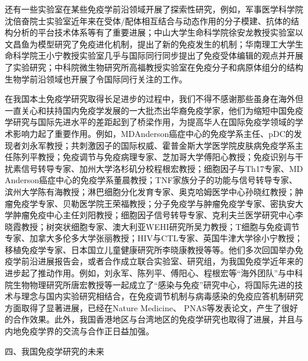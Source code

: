 还有一些实验室在某些免疫学前沿领域开展了探索性研究，例如，军事医学科学院沈倍奋院士实验室近年来在受体/配体相互结合与动态作用的分子模建、抗体的结构分析的平台技术体系等有了重要进展；中山大学生命科学院徐安龙教授实验室以文昌鱼为模型研究了免疫进化机制，提出了新的免疫发生的机制；华南理工大学生命科学院王小宁教授实验室几乎与国际同行同步提出了免疫受体编辑的观点并开展了实验研究；中科院微生物研究所高福教授实验室在免疫分子和病原体组分的结构生物学前沿领域也开展了令国际同行关注的工作。

在我国本土免疫学研究取得长足进步的过程中，我们不得不感谢那些虽身在海外但一直关心和扶持国内免疫学发展的一大批杰出华裔免疫学家，他们为缩短中国免疫学研究与国际先进水平的差距起到了桥梁作用，为提高华人在国际免疫学领域的学术影响力起了重要作用。例如，MDAnderson癌症中心的免疫学系主任、pDC的发现者刘永军教授；共刺激因子的国际权威、霍普金斯大学医学院皮肤病免疫学系主任陈列平教授；免疫调节与免疫病理专家、芝加哥大学傅阳心教授；免疫识别与干扰素信号转导专家、加州大学洛杉矶分校程根宏教授；细胞因子与Th17专家、MD
Anderson癌症中心的免疫学系董晨教授；TNF家族分子的功能与信号转导专家、滨州大学陈有海教授；淋巴细胞分化发育专家、奥克哈姆医学中心孙晓红教授；肿瘤免疫学专家、贝勒医学院王荣福教授；分子免疫学与肿瘤免疫学专家、密执安大学肿瘤免疫中心主任刘阳教授；细胞因子信号转导专家、克利夫兰医学研究中心李晓霞教授；树突状细胞专家、澳大利亚WEHI研究所吴力教授；T细胞与免疫调节专家、加拿大多伦多大学张丽教授；HIV与CTL专家、英国牛津大学徐小宁教授；移植免疫学专家、日本国立儿童健康研究所李晓康教授等等。他们多次回国举办免疫学前沿进展报告会，或者合作成立联合实验室、研究组，为我国免疫学近年来的进步起了推动作用。例如，刘永军、陈列平、傅阳心、程根宏等“海外团队”与中科院生物物理研究所唐宏教授等一起成立了“感染与免疫”研究中心，将国际先进的技术与理念与国内实验研究相结合，在免疫调节机制与病毒感染的免疫应答机制研究方面取得了显著进展，已经在Nature
Medicine、
PNAS等发表论文，产生了很好的合作效果。此外，我国香港地区与台湾地区的免疫学研究也取得了进展，并且与内地免疫学界的交流与合作正日益加强。

\begin{center}
{\large 四、我国免疫学研究的未来}
\end{center}

